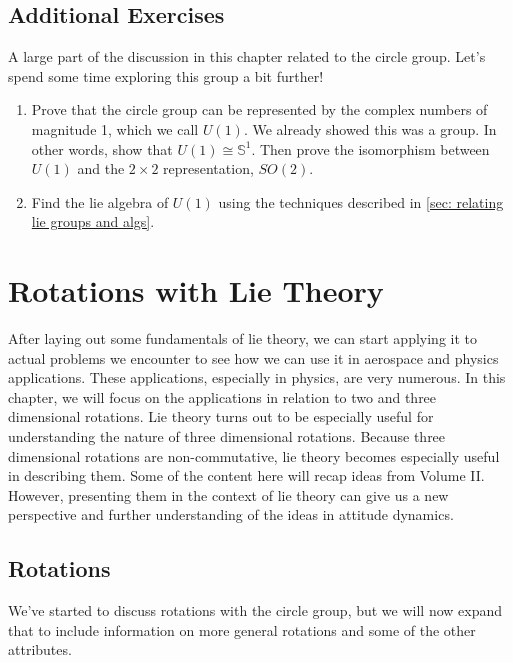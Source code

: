 \section{Additional Exercises}
\begin{exercise}
    A large part of the discussion in this chapter related to the circle group. Let's spend some time exploring this group a bit further!
    \begin{enumerate}
        \item Prove that the circle group can be represented by the complex numbers of magnitude 1, which we call $U(1)$. We already showed this was a group. In other words, show that $U(1)\cong \mathbb{S}^1$. Then prove the isomorphism between $U(1)$ and the $2\times 2$ representation, $SO(2)$.
        \item Find the \gls{lie algebra} of $U(1)$ using the techniques described in \autoref{sec: relating lie groups and algs}.
\end{enumerate}
\end{exercise}

\newpage
\printendnotes

\chapter{Rotations with Lie Theory}\label{chap:rot with lie}
After laying out some fundamentals of \gls{lie theory}, we can start applying it to actual problems we encounter to see how we can use it in aerospace and physics applications. These applications, especially in physics, are very numerous. In this chapter, we will focus on the applications in relation to two and three dimensional rotations. Lie theory turns out to be especially useful for understanding the nature of three dimensional rotations. Because three dimensional rotations are non-commutative, \gls{lie theory} becomes especially useful in describing them. Some of the content here will recap ideas from Volume II. However, presenting them in the context of \gls{lie theory} can give us a new perspective and further understanding of the ideas in attitude dynamics.

\section{Rotations}
We've started to discuss rotations with the circle group, but we will now expand that to include information on more general rotations and some of the other attributes.

